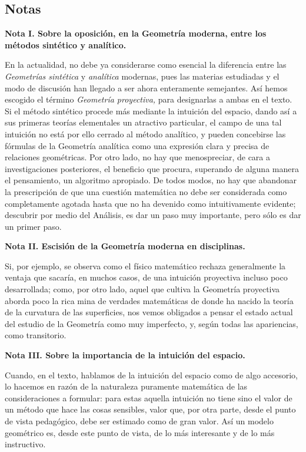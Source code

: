 \documentclass[a4paper, 12pt]{article}
\begin{document}
\newpage 

\subsection*{Notas}

\noindent\textbf{Nota I. Sobre la oposición, en la Geometría moderna, entre los métodos sintético y analítico.}

 En la actualidad, no debe ya considerarse como esencial la diferencia entre las \textit{Geometrías sintética }y \textit{analítica }modernas, pues las materias estudiadas y el modo de discusión han llegado a ser ahora enteramente semejantes. Así hemos escogido el término \textit{Geometría proyectiva, }para designarlas a ambas en el texto. Si el método sintético procede más mediante la intuición del espacio, dando así a sus primeras teorías elementales un atractivo particular, el campo de una tal intuición no está por ello cerrado al método analítico, y pueden concebirse las fórmulas de la Geometría analítica como una expresión clara y precisa de relaciones geométricas. Por otro lado, no hay que menospreciar, de cara a investigaciones posteriores, el beneficio que procura, superando de alguna manera el pensamiento, un algoritmo apropiado. De todos modos, no hay que abandonar la prescripción de que una cuestión matemática no debe ser considerada como completamente agotada hasta que no ha devenido como intuitivamente evidente; descubrir por medio del Análisis, es dar un paso muy importante, pero sólo es dar un primer paso. 

 

\noindent\textbf{Nota II. Escisión de la Geometría moderna en disciplinas.}

 Si, por ejemplo, se observa como el físico matemático rechaza generalmente la ventaja que sacaría, en muchos casos, de una intuición proyectiva incluso poco desarrollada; como, por otro lado, aquel que cultiva la Geometría proyectiva aborda poco la rica mina de verdades matemáticas de donde ha nacido la teoría de la curvatura de las superficies, nos vemos obligados a pensar el estado actual del estudio de la Geometría como muy imperfecto, y, según todas las apariencias, como transitorio. 

 \noindent\textbf{Nota III. Sobre la importancia de la intuición del espacio.}

 Cuando, en el texto, hablamos de la intuición del espacio como de algo accesorio, lo hacemos en razón de la naturaleza puramente matemática de las consideraciones a formular: para estas aquella intuición no tiene sino el valor de un método que hace las cosas sensibles, valor que, por otra parte, desde el punto de vista pedagógico, debe ser estimado como de gran valor. Así un modelo geométrico es, desde este punto de vista, de lo más interesante y de lo más instructivo.
\end{document}
